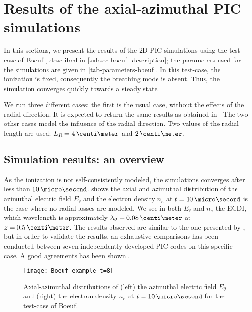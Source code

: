 
\section{Results of the axial-azimuthal PIC simulations}
  \label{sec-Zthetaresults}
  In this sections, we present the results of the \ac{2D} \ac{PIC} simulations using the test-case of Boeuf \citep{boeuf2018}, described in \cref{subsec-boeuf_description}\string; the parameters used for the simulations are given in \cref{tab-parameters-boeuf}.
  In this test-case, the ionization is fixed, consequently the breathing mode is absent.
  Thus, the simulation converges quickly towards a steady state.
  
  We run three different cases\string:
  the first is the usual case, without the effects of the radial direction.
  It is expected to return the same results as obtained in \citet{boeuf2018}.
  The two other cases model the influence of the radial direction.
  Two values of the radial length are used\string: $L_R=4\,\centi\meter$ and $2\,\centi\meter$.

  
  \subsection{Simulation results\string: an overview} \label{subsec-boeuf-overview}
    As the ionization is not self-consistently modeled, the simulations converges after less than $10\,\micro\second$.
     shows the axial and azimuthal distribution of the azimuthal electric field $E_{\theta}$ and the electron density $n_e$ at $t=10\,\micro\second$ is the case where no radial losses are modeled.
    We see in both $E_{\theta}$ and $n_e$ the \ac{ECDI}, which wavelength is approximately $\lambda_{\theta} = 0.08\,\centi\meter$ at $z=0.5\,\centi\meter$.
    The results observed are similar to the one presented by \citet{boeuf2018}, but in order to validate the results, an exhaustive comparisons has been conducted between seven independently developed \ac{PIC} codes on this specific case.
    A good agreements has been shown \citep{charoy2019}.
    

    \begin{figure}[hbt]
      \centering
      \texttt{[image: Boeuf\_example\_t=8]}
      \caption{ Axial-azimuthal distributions of (left) the azimuthal electric field $E_{\theta}$ and (right) the electron density $n_e$ at $t=10\,\micro\second$ for the test-case of Boeuf. } 
      \label{fig-overview_boeuf_neEx}
    \end{figure}

